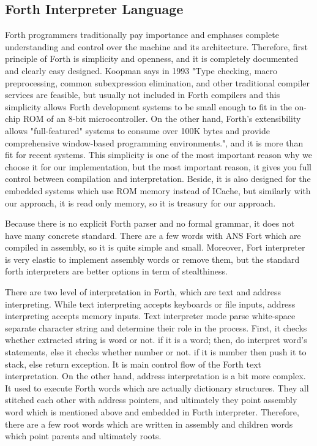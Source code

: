 	\subsection{Forth Interpreter Language}
		Forth programmers traditionally pay importance and emphases complete understanding and control over the machine and its architecture. Therefore, first principle of Forth is simplicity and openness, and it is completely documented and clearly easy designed. Koopman says in 1993 "Type checking, macro preprocessing, common subexpression elimination, and other traditional compiler services are feasible, but usually not included in Forth compilers and this simplicity allows Forth development systems to be small enough to fit in the on-chip ROM of an 8-bit microcontroller. On the other hand, Forth's extensibility allows "full-featured" systems to consume over 100K bytes and provide comprehensive window-based programming environments."\cite{koopman1993brief}, and it is more than fit for recent systems. This simplicity is one of the most important reason why we choose it for our implementation, but the most important reason, it gives you full control between compilation and interpretation. Beside, it is also designed for the embedded systems which use ROM memory instead of ICache, but similarly with our approach, it is read only memory, so it is treasury for our approach. 

		Because there is no explicit Forth parser and no formal grammar, it does not have many concrete standard. There are a few words with ANS Fort which are compiled in assembly, so it is quite simple and small. Moreover, Fort interpreter is very elastic to implement assembly words or remove them, but the standard forth interpreters are better options in term of stealthiness. 

		There are two level of interpretation in Forth, which are text and address interpreting\cite{koopman1993brief}. While text interpreting accepts keyboards or file inputs, address interpreting accepts memory inputs. Text interpreter mode parse white-space separate character string and determine their role in the process. First, it checks whether extracted string is word or not. if it is a word; then, do interpret word's statements, else it checks whether number or not. if it is number then push it to stack, else return exception. It is main control flow of the Forth text interpretation\cite{pelc2011programming}. On the other hand, address interpretation is a bit more complex. It used to execute Forth words which are actually dictionary structures. They all stitched each other with address pointers, and ultimately they point assembly word which is mentioned above and embedded in Forth interpreter. Therefore, there are a few root words which are written in assembly and children words which point parents and ultimately roots. 

